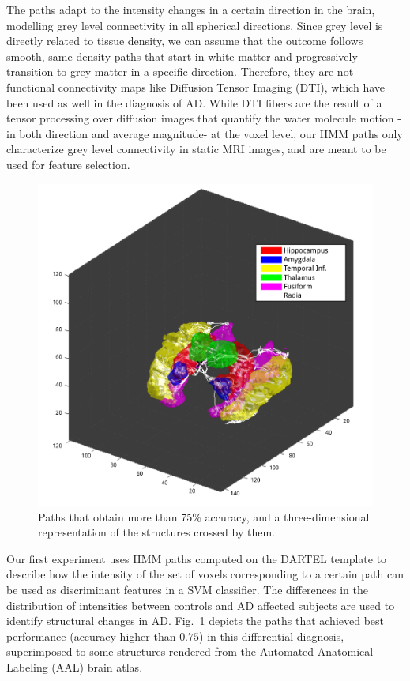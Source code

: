 The paths adapt to the intensity changes in a certain direction in the brain, modelling grey level connectivity in all spherical directions. Since grey level is directly related to tissue density, we can assume that the outcome follows smooth, same-density paths that start in white matter and progressively transition to grey matter in a specific direction. Therefore, they are not functional connectivity maps like Diffusion Tensor Imaging (DTI), which have been used as well in the diagnosis of AD\cite{Grana2011,Medina2008}. While DTI fibers are the result of a tensor processing over diffusion images that quantify the water molecule motion -in both direction and average magnitude- at the voxel level, our \ac{HMM} paths only characterize grey level connectivity in static MRI images, and are meant to be used for feature selection. 

\begin{figure}
	\begin{center}
		\includegraphics[width=\columnwidth]{Graphics/ch6/radia&structures}
		\caption{Paths that obtain more than 75\% accuracy, and a three-dimensional representation of the structures crossed by them.}
		\label{fig:bestPaths}
	\end{center}
\end{figure}

Our first experiment uses \ac{HMM} paths computed on the DARTEL template to describe how the intensity of the set of voxels corresponding to a certain path can be used as discriminant features in a SVM classifier. The differences in the distribution of intensities between controls and AD affected subjects are used to identify structural changes in AD. Fig.~\ref{fig:bestPaths} depicts the paths that achieved best performance (accuracy higher than $0.75$) in this differential diagnosis, superimposed to some structures rendered from the Automated Anatomical Labeling (AAL) brain atlas\cite{Tzourio-Mazoyer2002}.

